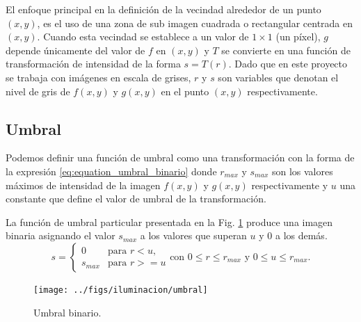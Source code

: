 El enfoque principal en la definición de la vecindad alrededor de un punto $(x,y)$, es el uso de una zona de sub imagen cuadrada o rectangular centrada en $(x,y)$. Cuando esta vecindad se establece a un valor de $1 \times 1$ (un píxel), $g$ depende únicamente del valor de $f$ en $(x,y)$ y $T$ se convierte en una función de transformación de intensidad de la forma $s=T(r)$. Dado que en este proyecto se trabaja con imágenes en escala de grises, $r$ y $s$ son variables que denotan el nivel de gris de $f(x,y)$ y $g(x,y)$ en el punto $(x,y)$ respectivamente.
\subsection{Umbral}
Podemos definir una función de umbral como una transformación con la forma de la expresión \eqref{eq:equation_umbral_binario} donde $r_{max}$ y $s_{max}$ son los valores máximos de intensidad de la imagen $f(x,y)$ y $g(x,y)$ respectivamente y $u$ una constante que define el valor de umbral de la transformación.

La función de umbral particular presentada en la Fig. \ref{fig:umbral_curve} produce una imagen binaria asignando el valor $s_{max}$ a los valores que superan $u$ y $0$ a los demás.
\begin{equation}
\label{eq:equation_umbral_binario}
s= 
\begin{cases} 0 & \text{para $r<u$,}
\\
s_{max} &\text{para $r>=u$}
\end{cases} \textrm{con } 0 \leq r \leq r_{max} \textrm{ y } 0 \leq u \leq r_{max}.
\end{equation}

\begin{figure}[tbhp]
   \centering
        \texttt{[image: ../figs/iluminacion/umbral]}
    \caption[Umbral binario]{Umbral binario.}
   \label{fig:umbral_curve}                %
\end{figure}
